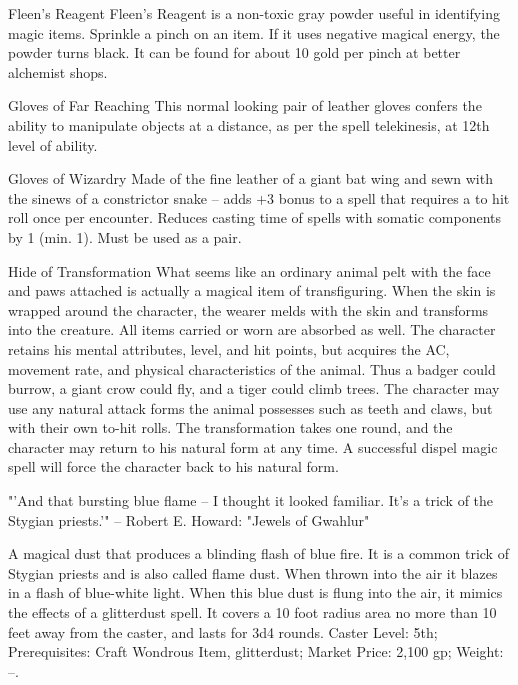 Fleen's Reagent
Fleen's Reagent is a non-toxic gray powder useful in identifying magic items. Sprinkle a pinch on an item. If it uses negative magical energy, the powder turns black. It can be found for about 10 gold per pinch at better alchemist shops.

Gloves of Far Reaching
This normal looking pair of leather gloves confers the ability to manipulate objects at a distance, as per the spell telekinesis, at 12th level of ability.


Gloves of Wizardry
Made of the fine leather of a giant bat wing and sewn with the sinews of a constrictor snake – adds +3 bonus to a spell that requires a to hit roll once per encounter.  Reduces casting time of spells with somatic components by 1 (min. 1).  Must be used as a pair.



Hide of Transformation
What seems like an ordinary animal pelt with the face and paws attached is actually a magical item of transfiguring. When the skin is wrapped around the character, the wearer melds with the skin and transforms into the creature. All items carried or worn are absorbed as well. The character retains his mental attributes, level, and hit points, but acquires the AC, movement rate, and physical characteristics of the animal. Thus a badger could burrow, a giant crow could fly, and a tiger could climb trees. The character may use any natural attack forms the animal possesses such as teeth and claws, but with their own to-hit rolls. The transformation takes one round, and the character may return to his natural form at any time. A successful dispel magic spell will force the character back to his natural form.


 "'And that bursting blue flame -- I thought it looked familiar. It's a trick of the Stygian priests.'" -- Robert E. Howard: "Jewels of Gwahlur"

A magical dust that produces a blinding flash of blue fire. It is a common trick of Stygian priests and is also called flame dust. When thrown into the air it blazes in a flash of blue-white light.  When this blue dust is flung into the air, it mimics the effects of a glitterdust spell. It covers a 10 foot radius area no more than 10 feet away from the caster, and lasts for 3d4 rounds. Caster Level: 5th; Prerequisites: Craft Wondrous Item, glitterdust; Market Price: 2,100 gp; Weight: --.


